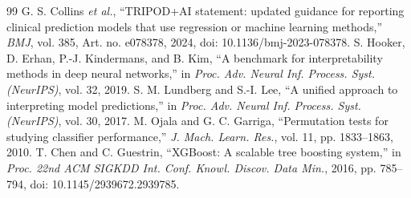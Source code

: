 \begin{thebibliography}{99}
 G. S. Collins \textit{et al.}, ``TRIPOD+AI statement: updated guidance for reporting clinical prediction models that use regression or machine learning methods,'' \textit{BMJ}, vol. 385, Art. no. e078378, 2024, doi: 10.1136/bmj-2023-078378.
 S. Hooker, D. Erhan, P.-J. Kindermans, and B. Kim, ``A benchmark for interpretability methods in deep neural networks,'' in \textit{Proc. Adv. Neural Inf. Process. Syst. (NeurIPS)}, vol. 32, 2019.
 S. M. Lundberg and S.-I. Lee, ``A unified approach to interpreting model predictions,'' in \textit{Proc. Adv. Neural Inf. Process. Syst. (NeurIPS)}, vol. 30, 2017.
 M. Ojala and G. C. Garriga, ``Permutation tests for studying classifier performance,'' \textit{J. Mach. Learn. Res.}, vol. 11, pp. 1833--1863, 2010.
 T. Chen and C. Guestrin, ``XGBoost: A scalable tree boosting system,'' in \textit{Proc. 22nd ACM SIGKDD Int. Conf. Knowl. Discov. Data Min.}, 2016, pp. 785--794, doi: 10.1145/2939672.2939785.


\end{thebibliography}
